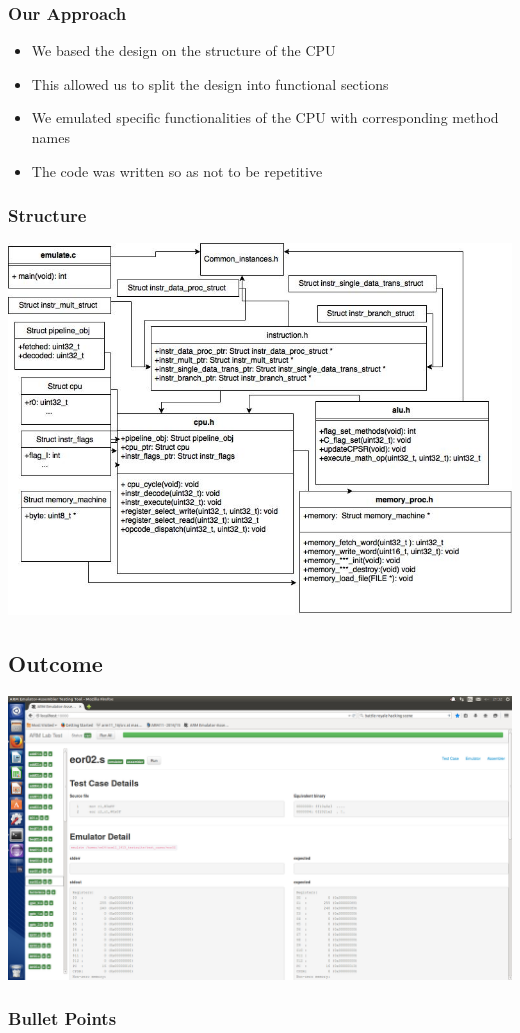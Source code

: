 \documentclass{beamer}
\begin{document}
\begin{frame}
\frametitle{Our Approach}

\begin{itemize}
\item We based the design on the structure of the CPU
\item This allowed us to split the design into functional sections
\item We emulated specific functionalities of the CPU with corresponding method names
\item The code was written so as not to be repetitive 
\end{itemize}

\end{frame}
\begin{frame}
\frametitle{Structure}
\includegraphics[width=0.9\linewidth]{Images/Emulator_XML(2).jpg}
\end{frame}


\subsection{Outcome}
\begin{frame}
\includegraphics[width=0.9\linewidth]{Images/EmulatorTestCases.png}
\frametitle{Bullet Points}




\end{frame}
\end{document}
